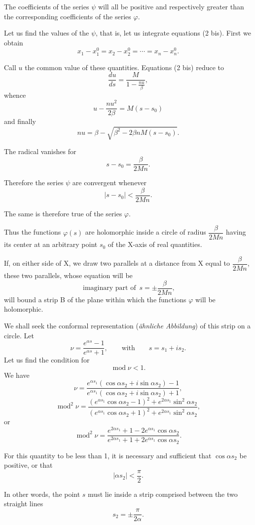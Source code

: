 \documentclass[11pt]{article}
\begin{document}
The coefficients of the series $\psi$ will all be positive and respectively greater than the corresponding coefficients of the series $\varphi$.

Let us find the values of the $\psi$, that is, let us integrate equations (2 bis). First we obtain
\[
x_1-x_1^0=x_2-x_2^0=\cdots=x_n-x_n^0.
\]

Call $u$ the common value of these quantities. Equations (2 bis) reduce to
\[
\frac{du}{ds}=\frac{M}{1-\frac{nu}{\beta}},
\]
whence
\[
u-\frac{n u^2}{2\beta}=M(s-s_0)
\]
and finally
\[
nu=\beta-\sqrt{\beta^2-2\beta nM(s-s_0)}.
\]

The radical vanishes for
\[
s-s_0=\frac{\beta}{2Mn}.
\]

Therefore the series $\psi$ are convergent whenever
\[
|s-s_0|<\frac{\beta}{2Mn}.
\]

The same is therefore true of the series $\varphi$.

Thus the functions $\varphi(s)$ are holomorphic inside a circle of radius $\dfrac{\beta}{2Mn}$ having its center at an arbitrary point $s_0$ of the X-axis of real quantities.

If, on either side of X, we draw two parallels at a distance from X equal to $\dfrac{\beta}{2Mn}$, these two parallels, whose equation will be
\[
\operatorname{imaginary\ part\ of}\ s=\pm\frac{\beta}{2Mn},
\]
will bound a strip B of the plane within which the functions $\varphi$ will be holomorphic.

We shall seek the conformal representation (\emph{ähnliche Abbildung}) of this strip on a circle. Let
\[
\nu=\frac{e^{\alpha s}-1}{e^{\alpha s}+1},\qquad \text{with}\qquad s=s_1+is_2.
\]
Let us find the condition for
\[
\operatorname{mod}\nu<1.
\]
We have
\[
\nu=\frac{e^{\alpha s_1}(\cos \alpha s_2+i\sin \alpha s_2)-1}{e^{\alpha s_1}(\cos \alpha s_2+i\sin \alpha s_2)+1},
\]
\[
\operatorname{mod}^2\nu=\frac{(e^{\alpha s_1}\cos\alpha s_2-1)^2+e^{2\alpha s_1}\sin^2\alpha s_2}{(e^{\alpha s_1}\cos\alpha s_2+1)^2+e^{2\alpha s_1}\sin^2\alpha s_2},
\]
or
\[
\operatorname{mod}^2\nu=\frac{e^{2\alpha s_1}+1-2e^{\alpha s_1}\cos\alpha s_2}{e^{2\alpha s_1}+1+2e^{\alpha s_1}\cos\alpha s_2}.
\]

For this quantity to be less than 1, it is necessary and sufficient that $\cos\alpha s_2$ be positive, or that
\[
|\alpha s_2|<\frac{\pi}{2}.
\]

In other words, the point $s$ must lie inside a strip comprised between the two straight lines
\[
s_2=\pm\frac{\pi}{2\alpha}.
\]
\end{document}
